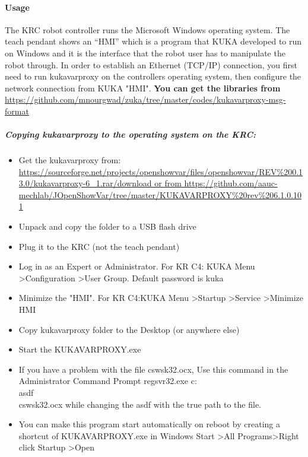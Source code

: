 \paragraph{Usage}
The KRC robot controller runs the Microsoft Windows operating system. The teach pendant shows an “HMI” which is a program that KUKA developed to run on Windows and it is the interface that the robot user has to manipulate the robot through. In order to establish an Ethernet (TCP/IP) connection, you first need to run kukavarproxy on the controllers operating system, then configure the network connection from KUKA "HMI".
\newline \vspace{.3cm}
\textbf{You can get the libraries from}
\newline \url{https://github.com/mnourgwad/zuka/tree/master/codes/kukavarproxy-msg-format}
\subparagraph{Copying kukavarproxy to the operating system on the KRC:}
\begin{itemize}
	\item Get the kukavarproxy from: \newline  \url{https://sourceforge.net/projects/openshowvar/files/openshowvar/REV\%200.13.0/kukavarproxy-6_1.rar/download  or from https://github.com/aauc-mechlab/JOpenShowVar/tree/master/KUKAVARPROXY\%20rev\%206.1.0.101}
	\item Unpack and copy the folder to a USB flash drive
	\item Plug it to the KRC (not the teach pendant)
	\item Log in as an Expert or Administrator. For KR C4: KUKA Menu \textgreater Configuration \textgreater User Group. Default password is kuka
	\item Minimize the "HMI". For KR C4:KUKA Menu \textgreater Startup \textgreater Service \textgreater Minimize HMI
	\item Copy kukavarproxy folder to the Desktop (or anywhere else)
	\item Start the KUKAVARPROXY.exe
	\item If you have a problem with the file cswsk32.ocx, Use this command in the Administrator Command Prompt regsvr32.exe c:\\asdf\\cswsk32.ocx while changing the asdf with the true path to the file.
	\item You can make this program start automatically on reboot by creating a shortcut of KUKAVARPROXY.exe in Windows Start \textgreater All Programs\textgreater Right click Startup \textgreater Open
	
\end{itemize}

